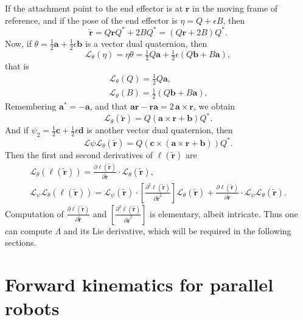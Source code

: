 \documentclass[reqno,12pt]{amsart}
\newcommand{\liederiv}{\mathcal L}
\begin{document}
If the attachment point to the end effector is at $\bm r$ in the moving frame of reference, and if the pose of the end effector is $\eta = Q + \epsilon B$, then
\begin{equation}
\tilde{\bm r} = Q \bm r Q^* + 2 B Q^* = (Q \bm r + 2 B) Q^* .
\end{equation}
Now, if $\theta = \tfrac12 \bm a + \tfrac12 \epsilon \bm b$ is a vector dual quaternion, then
\begin{equation}
\liederiv_\theta(\eta) = \eta\theta = \tfrac12 Q \bm a + \tfrac12 \epsilon (Q \bm b + B \bm a),
\end{equation}
that is
\begin{gather}
\liederiv_\theta(Q) = \tfrac12 Q \bm a, \\
\liederiv_\theta(B) = \tfrac12 (Q \bm b + B \bm a) .
\end{gather}
Remembering $\bm a^* = -\bm a$, and that $\bm a \bm r - \bm r \bm a = 2 \,\bm a \times \bm r$, we obtain
\begin{equation}
\label{lie deriv point}
\liederiv_\theta(\tilde{\bm r}) = Q (\bm a \times \bm r + \bm b) Q^*.
\end{equation}
And if $\psi_2 = \tfrac12 \bm c + \tfrac12 \epsilon \bm d$ is another vector dual quaternion, then
\begin{equation}
\liederiv\psi \liederiv_\theta(\tilde{\bm r}) = Q(\bm c \times (\bm a \times \bm r + \bm b)) Q^* .
\end{equation}
Then the first and second derivatives of $\ell(\tilde{\bm r})$ are
\begin{gather}
\liederiv_\theta(\ell(\tilde{\bm r})) = \frac{\partial \ell(\tilde{\bm r})}{\partial \tilde{\bm r}} \cdot \liederiv_\theta(\tilde{\bm r}) , \\
\liederiv_\psi \liederiv_\theta(\ell(\tilde{\bm r})) = \liederiv_\psi(\tilde{\bm r}) \cdot \left[\frac{\partial^2 \ell(\tilde{\bm r})}{\partial \tilde{\bm r}^2} \right] \liederiv_\theta(\tilde{\bm r}) + \frac{\partial \ell(\tilde{\bm r})}{\partial \tilde{\bm r}} \cdot \liederiv_\psi \liederiv_\theta(\tilde{\bm r}) .
\end{gather}
Computation of $\frac{\partial \ell(\tilde{\bm r})}{\partial \tilde{\bm r}}$ and $\left[\frac{\partial^2 \ell(\tilde{\bm r})}{\partial \tilde{\bm r}^2} \right]$ is elementary, albeit intricate.  Thus one can compute $\mathsf\Lambda$ and its Lie derivative, which will be required in the following sections.

\section{Forward kinematics for parallel robots}
\label{forward kinematics}
\end{document}
